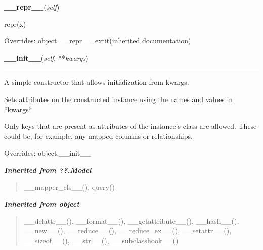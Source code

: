     \vspace{0.5ex}

\hspace{.8\funcindent}\begin{boxedminipage}{\funcwidth}

    \raggedright \textbf{\_\_repr\_\_}(\textit{self})

\setlength{\parskip}{2ex}
    repr(x)

\setlength{\parskip}{1ex}
      Overrides: object.\_\_repr\_\_ 	extit{(inherited documentation)}

    \end{boxedminipage}

    \vspace{0.5ex}

\hspace{.8\funcindent}\begin{boxedminipage}{\funcwidth}

    \raggedright \textbf{\_\_init\_\_}(\textit{self}, **\textit{kwargs})

    \vspace{-1.5ex}

    \rule{\textwidth}{0.5\fboxrule}
\setlength{\parskip}{2ex}
    A simple constructor that allows initialization from kwargs.

    Sets attributes on the constructed instance using the names and values 
    in ``kwargs``.

    Only keys that are present as attributes of the instance's class are 
    allowed. These could be, for example, any mapped columns or 
    relationships.

\setlength{\parskip}{1ex}
      Overrides: object.\_\_init\_\_

    \end{boxedminipage}


\large{\textbf{\textit{Inherited from ??.Model}}}

\begin{quote}
\_\_mapper\_cls\_\_(), query()
\end{quote}

\large{\textbf{\textit{Inherited from object}}}

\begin{quote}
\_\_delattr\_\_(), \_\_format\_\_(), \_\_getattribute\_\_(), \_\_hash\_\_(), \_\_new\_\_(), \_\_reduce\_\_(), \_\_reduce\_ex\_\_(), \_\_setattr\_\_(), \_\_sizeof\_\_(), \_\_str\_\_(), \_\_subclasshook\_\_()
\end{quote}


